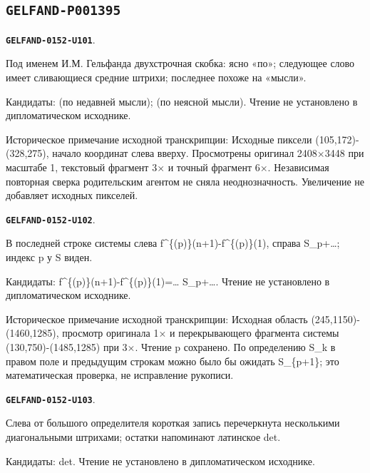 \documentclass[11pt]{article}
\theoremstyle{definition}
\theoremstyle{remark}
\begin{document}
\subsection*{\texttt{GELFAND-P001395}}
\par\noindent\leavevmode{}\label{GELFAND-0152-U101}\label{GELFAND-P001395:speaker-parenthesis:note}\textbf{\texttt{GELFAND-0152-U101}}.\nopagebreak[4]\par
Под именем И.М. Гельфанда двухстрочная скобка: ясно «по»; следующее слово имеет сливающиеся средние штрихи; последнее похоже на «мысли».\par
Кандидаты: (по недавней мысли); (по неясной мысли). Чтение не установлено в дипломатическом исходнике.\par
Историческое примечание исходной транскрипции: Исходные пиксели (105,172)-(328,275), начало координат слева вверху. Просмотрены оригинал 2408×3448 при масштабе 1, текстовый фрагмент 3× и точный фрагмент 6×. Независимая повторная сверка родительским агентом не сняла неоднозначность. Увеличение не добавляет исходных пикселей.\par\medskip
\par\noindent\leavevmode{}\label{GELFAND-0152-U102}\label{GELFAND-P001395:system-last-index:note}\textbf{\texttt{GELFAND-0152-U102}}.\nopagebreak[4]\par
В последней строке системы слева f\textasciicircum{}\{(p)\}(n+1)-f\textasciicircum{}\{(p)\}(1), справа S\_p+…; индекс p у S виден.\par
Кандидаты: f\textasciicircum{}\{(p)\}(n+1)-f\textasciicircum{}\{(p)\}(1)=… S\_p+…. Чтение не установлено в дипломатическом исходнике.\par
Историческое примечание исходной транскрипции: Исходная область (245,1150)-(1460,1285), просмотр оригинала 1× и перекрывающего фрагмента системы (130,750)-(1485,1285) при 3×. Чтение p сохранено. По определению S\_k в правом поле и предыдущим строкам можно было бы ожидать S\_\{p+1\}; это математическая проверка, не исправление рукописи.\par\medskip
\par\noindent\leavevmode{}\label{GELFAND-0152-U103}\label{GELFAND-P001395:determinant-cancellation:note}\textbf{\texttt{GELFAND-0152-U103}}.\nopagebreak[4]\par
Слева от большого определителя короткая запись перечеркнута несколькими диагональными штрихами; остатки напоминают латинское det.\par
Кандидаты: det. Чтение не установлено в дипломатическом исходнике.\par
\end{document}
